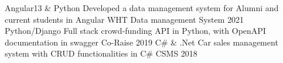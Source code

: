 \begin{cvhonors}
  \cvhonor
    {Angular13 \& Python}
    {Developed a data management system for Alumni and current students in Angular}
    {WHT Data management System}
    {2021}
  \cvhonor
    {Python/Django}
    {Full stack crowd-funding API in Python, with OpenAPI documentation in swagger}
    {Co-Raise}
    {2019}
  \cvhonor
    {C\# \& .Net}
    {Car sales management system with CRUD functionalities in C\#}
    {CSMS}
    {2018}
\end{cvhonors}
